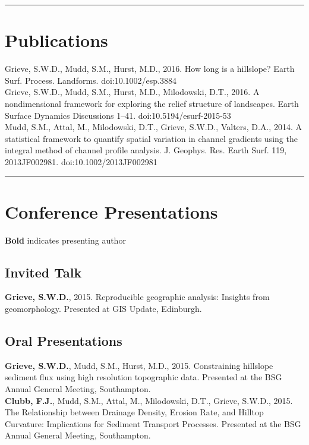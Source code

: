 \documentclass[10pt, a4paper]{article}
\begin{document}
\hrule
\section*{Publications}
\noindent

Grieve, S.W.D., Mudd, S.M., Hurst, M.D., 2016. How long is a hillslope? Earth Surf. Process. Landforms. doi:10.1002/esp.3884\\[0.05cm]

Grieve, S.W.D., Mudd, S.M., Hurst, M.D., Milodowski, D.T., 2016. A nondimensional framework for exploring the relief structure of landscapes. Earth Surface Dynamics Discussions 1–41. doi:10.5194/esurf-2015-53\\[0.05cm]

Mudd, S.M., Attal, M., Milodowski, D.T., Grieve, S.W.D., Valters, D.A., 2014. A statistical framework to quantify spatial variation in channel gradients using the integral method of channel profile analysis. J. Geophys. Res. Earth Surf. 119, 2013JF002981. doi:10.1002/2013JF002981\\[0.05cm]

\hrule
\section*{Conference Presentations}
\noindent
\textbf{Bold} indicates presenting author

\subsection*{Invited Talk}
\textbf{Grieve, S.W.D.}, 2015. Reproducible geographic analysis: Insights from geomorphology. Presented at GIS Update, Edinburgh.

\subsection*{Oral Presentations}

\textbf{Grieve, S.W.D.}, Mudd, S.M., Hurst, M.D., 2015. Constraining hillslope sediment flux using high resolution topographic data. Presented at the BSG Annual General Meeting, Southampton.\\[0.05cm]

\textbf{Clubb, F.J.}, Mudd, S.M., Attal, M., Milodowski, D.T., Grieve, S.W.D., 2015. The Relationship between Drainage Density, Erosion Rate, and Hilltop Curvature: Implications for Sediment Transport Processes. Presented at the BSG Annual General Meeting, Southampton.
\end{document}

